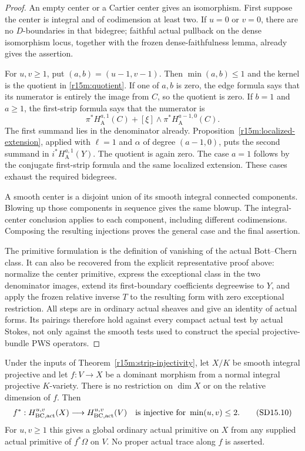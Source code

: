 \begin{proof}
An empty center or a Cartier center gives an isomorphism.
First suppose the center is integral and of codimension
at least two.  If $u=0$ or $v=0$, there are no $D$-boundaries
in that bidegree; faithful actual pullback on the dense
isomorphism locus, together with the frozen dense-faithfulness
lemma, already gives the assertion.

For $u,v\geq1$, put $(a,b)=(u-1,v-1)$.
Then $\min(a,b)\leq1$ and the kernel is the quotient
in \eqref{r15m:quotient}.
If one of $a,b$ is zero, the edge formula says that its
numerator is entirely the image from $C$, so the quotient
is zero.  If $b=1$ and $a\geq1$, the first-strip formula
says that the numerator is
\[
             \pi^*H_{\mathrm A}^{a,1}(C)
                   +[\xi]\wedge\pi^*H_{\mathrm A}^{a-1,0}(C).
\]
The first summand lies in the denominator already.
Proposition~\ref{r15m:localized-extension}, applied with
$\ell=1$ and $\alpha$ of degree $(a-1,0)$, puts the
second summand in $i^*H_{\mathrm A}^{a,1}(Y)$.
The quotient is again zero.  The case $a=1$ follows by
the conjugate first-strip formula and the same localized
extension.  These cases exhaust the required bidegrees.

A smooth center is a disjoint union of its smooth integral
connected components.  Blowing up those components in
sequence gives the same blowup.  The integral-center
conclusion applies to each component, including different
codimensions.  Composing the resulting injections proves
the general case and the final assertion.

The primitive formulation is the definition of vanishing
of the actual Bott--Chern class.  It can also be recovered
from the explicit representative proof above: normalize the
center primitive, express the exceptional class in the two
denominator images, extend its first-boundary coefficients
degreewise to $Y$, and apply the frozen relative inverse
$T$ to the resulting form with zero exceptional restriction.
All steps are in ordinary actual sheaves and give an
identity of actual forms.  Its pairings therefore hold
against every compact actual test by actual Stokes, not
only against the smooth tests used to construct the special
projective-bundle PWS operators.
\end{proof}

\begin{corollary}
\label{r15m:dominant-strips}
Under the inputs of Theorem~\ref{r15m:strip-injectivity},
let $X/K$ be smooth integral projective and let
$f:V\to X$ be a dominant morphism from a normal integral
projective $K$-variety.  There is no restriction on
$\dim X$ or on the relative dimension of $f$.  Then
\[
                  f^*:H_{\mathrm{BC,act}}^{u,v}(X)
                       \longrightarrow H_{\mathrm{BC,act}}^{u,v}(V)
                  \quad\hbox{is injective for }\min(u,v)\leq2.
\tag{SD15.10}\label{r15m:dominant-strip-injection}
\]
For $u,v\geq1$ this gives a global ordinary actual primitive
on $X$ from any supplied actual primitive of $f^*\Omega$
on $V$.  No proper actual trace along $f$ is asserted.
\end{corollary}

